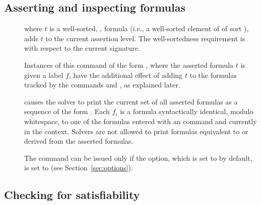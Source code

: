 \subsection{Asserting and inspecting formulas} \label{sec:assert}

\begin{description}
%
\item[]
where $t$ is a well-sorted, , formula 
(i.e., a well-sorted element of  of sort ),
adds $t$ to the current assertion level.
The well-sortedness requirement is with respect to the current signature.


Instances of this command of the form , 
where the asserted formula $t$ is given a label $f$, 
have the additional effect of adding $t$ to the formulas tracked 
by the commands  and , as explained later.
\smallskip

%
\item[]
causes the solver to print the current set of all asserted formulas
as a sequence of the form .
Each $f_i$ is a formula syntactically identical, modulo whitespace, 
to one of the formulas entered with an  command and 
currently in the context.
Solvers are not allowed to print formulas equivalent to or derived from 
the asserted formulas.

The command can be issued only if the  option,
which is set to  by default, is set to  
(see Section~\ref{sec:options}).

\end{description}


\subsection{Checking for satisfiability} \label{sec:checking-for-sat}

